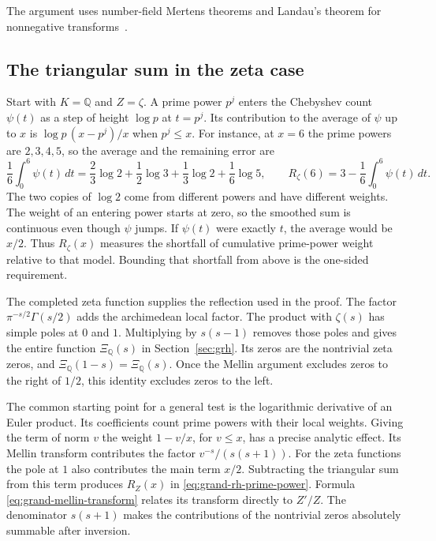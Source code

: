 \documentclass[11pt]{amsart}
\theoremstyle{definition}
\theoremstyle{remark}
\numberwithin{equation}{section}
\begin{document}
The argument uses number-field Mertens theorems
\cite{GarciaLeeNumberFieldMertens} and Landau's theorem for
nonnegative transforms~\cite{Landau1905}.

\subsection{The triangular sum in the zeta case}\label{sec:proof-overview}

Start with \(K=\mathbb Q\) and \(Z=\zeta\). A prime power \(p^j\)
enters the Chebyshev count \(\psi(t)\) as a step of height \(\log p\)
at \(t=p^j\). Its contribution to the average of \(\psi\) up to \(x\)
is \(\log p\,(x-p^j)/x\) when \(p^j\le x\). For instance, at \(x=6\)
the prime powers are \(2,3,4,5\), so the average and the remaining
error are
\[
 \frac1{6}\int_0^6\psi(t)\,dt
 =\frac23\log 2+\frac12\log 3+\frac13\log 2+\frac16\log 5,
 \qquad
 R_\zeta(6)=3-\frac1{6}\int_0^6\psi(t)\,dt .
\]
The two copies of \(\log 2\) come from different powers and have
different weights. The weight of an entering power starts at zero,
so the smoothed sum is continuous even though \(\psi\) jumps.
If \(\psi(t)\) were exactly \(t\), the average would be \(x/2\).
Thus \(R_\zeta(x)\) measures the shortfall of cumulative prime-power
weight relative to that model. Bounding that shortfall from above
is the one-sided requirement.

The completed zeta function supplies the reflection used in the proof.
The factor \(\pi^{-s/2}\Gamma(s/2)\) adds the archimedean local factor.
The product with \(\zeta(s)\) has simple poles at \(0\) and \(1\).
Multiplying by \(s(s-1)\) removes those poles and gives the entire
function \(\Xi_{\mathbb Q}(s)\) in Section~\ref{sec:grh}.
Its zeros are the nontrivial zeta zeros, and
\(\Xi_{\mathbb Q}(1-s)=\Xi_{\mathbb Q}(s)\).
Once the Mellin argument excludes zeros to the right of \(1/2\),
this identity excludes zeros to the left.

The common starting point for a general test is the logarithmic derivative of an Euler
product. Its coefficients count prime powers with their local weights.
Giving the term of norm \(v\) the weight \(1-v/x\), for \(v\le x\),
has a precise analytic effect. Its Mellin transform contributes the
factor \(v^{-s}/(s(s+1))\). For the zeta functions the pole at \(1\)
also contributes the main term \(x/2\). Subtracting the triangular sum
from this term produces \(R_Z(x)\) in
\eqref{eq:grand-rh-prime-power}. Formula
\eqref{eq:grand-mellin-transform} relates its transform directly to
\(Z'/Z\). The denominator \(s(s+1)\) makes the contributions of
the nontrivial zeros absolutely summable after inversion.
\end{document}
